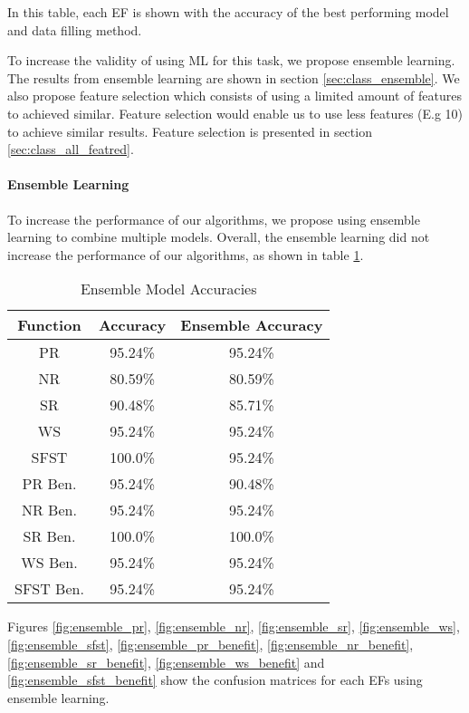 \documentclass[12pt,letterpaper]{article}
\begin{document}
In this table, each \ac{EF} is shown with the accuracy of the best performing model and data filling method.


To increase the validity of using \ac{ML} for this task, we propose ensemble learning.
The results from ensemble learning are shown in section \ref{sec:class_ensemble}.
We also propose feature selection which consists of using a limited amount of features to achieved similar.
Feature selection would enable us to use less features (E.g 10) to achieve similar results.
Feature selection is presented in section \ref{sec:class_all_featred}.


\paragraph{Ensemble Learning}\label{sec:class_all_ensemble}
To increase the performance of our algorithms, we propose using ensemble learning to combine multiple models.
Overall, the ensemble learning did not increase the performance of our algorithms, as shown in table \ref{tab_class_all:class_ensemble}.
\begin{table}[H]
\centering
\begin{tabular}{|c|c|c|}
\hline
\textbf{Function} & \textbf{Accuracy} & \textbf{Ensemble Accuracy} \\
\hline
PR      & 95.24\% & 95.24\% \\
\hline
NR      & 80.59\% & 80.59\%\\
\hline
SR      & 90.48\% & 85.71\%\\
\hline
WS      & 95.24\% & 95.24\%\\
\hline
SFST    & 100.0\% & 95.24\%\\
\hline
PR Ben. & 95.24\% & 90.48\%\\
\hline
NR Ben. & 95.24\% & 95.24\%\\
\hline
SR Ben. & 100.0\% & 100.0\%\\
\hline
WS Ben. & 95.24\% & 95.24\%\\
\hline
SFST Ben. & 95.24\% & 95.24\%\\
\hline
\end{tabular}
\caption{Ensemble Model Accuracies}
\label{tab_class_all:class_ensemble}
\end{table}

Figures \ref{fig:ensemble_pr}, \ref{fig:ensemble_nr}, \ref{fig:ensemble_sr}, \ref{fig:ensemble_ws}, \ref{fig:ensemble_sfst}, \ref{fig:ensemble_pr_benefit}, \ref{fig:ensemble_nr_benefit}, \ref{fig:ensemble_sr_benefit}, \ref{fig:ensemble_ws_benefit} and \ref{fig:ensemble_sfst_benefit} show the confusion matrices for each EFs using ensemble learning.
\end{document}
